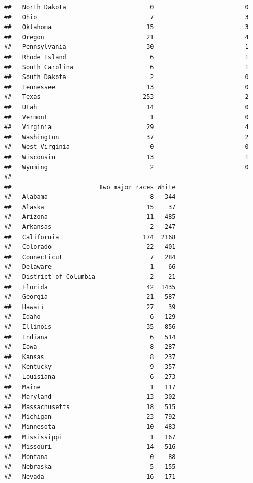 \documentclass[]{book}
\theoremstyle{definition}
\theoremstyle{definition}
\theoremstyle{definition}
\theoremstyle{remark}
\begin{document}
\begin{verbatim}
##   North Dakota                       0                         0
##   Ohio                               7                         3
##   Oklahoma                          15                         3
##   Oregon                            21                         4
##   Pennsylvania                      30                         1
##   Rhode Island                       6                         1
##   South Carolina                     6                         1
##   South Dakota                       2                         0
##   Tennessee                         13                         0
##   Texas                            253                         2
##   Utah                              14                         0
##   Vermont                            1                         0
##   Virginia                          29                         4
##   Washington                        37                         2
##   West Virginia                      0                         0
##   Wisconsin                         13                         1
##   Wyoming                            2                         0
##                       
##                        Two major races White
##   Alabama                            8   344
##   Alaska                            15    37
##   Arizona                           11   485
##   Arkansas                           2   247
##   California                       174  2168
##   Colorado                          22   401
##   Connecticut                        7   284
##   Delaware                           1    66
##   District of Columbia               2    21
##   Florida                           42  1435
##   Georgia                           21   587
##   Hawaii                            27    39
##   Idaho                              6   129
##   Illinois                          35   856
##   Indiana                            6   514
##   Iowa                               8   287
##   Kansas                             8   237
##   Kentucky                           9   357
##   Louisiana                          6   273
##   Maine                              1   117
##   Maryland                          13   302
##   Massachusetts                     18   515
##   Michigan                          23   792
##   Minnesota                         10   483
##   Mississippi                        1   167
##   Missouri                          14   516
##   Montana                            0    88
##   Nebraska                           5   155
##   Nevada                            16   171

\end{verbatim}
\end{document}
